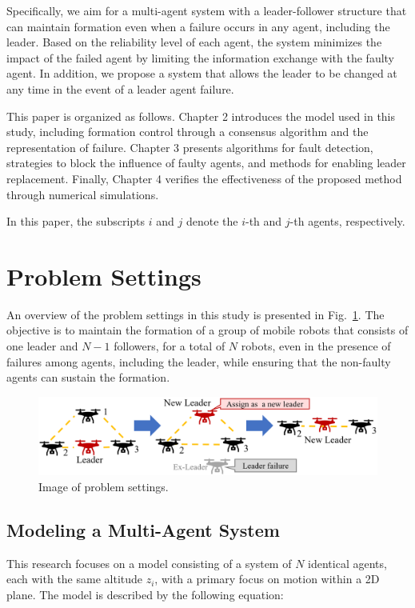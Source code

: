 \documentclass[a4paper,fleqn,10pt,twocolumn]{SICE_ISCS}
\newcommand{\Figref}[1]{{Fig.~\ref{#1}}}
\begin{document}
Specifically, we aim for a multi-agent system with a leader-follower structure that can maintain formation even when a failure occurs in any agent, including the leader. Based on the reliability level of each agent, the system minimizes the impact of the failed agent by limiting the information exchange with the faulty agent. In addition, we propose a system that allows the leader to be changed at any time in the event of a leader agent failure.

This paper is organized as follows. Chapter 2 introduces the model used in this study, including formation control through a consensus algorithm and the representation of failure. Chapter 3 presents algorithms for fault detection, strategies to block the influence of faulty agents, and methods for enabling leader replacement. Finally, Chapter 4 verifies the effectiveness of the proposed method through numerical simulations.

In this paper, the subscripts $i$ and $j$ denote the $i$-th and $j$-th agents, respectively.

\section{Problem Settings}
An overview of the problem settings in this study is presented in \Figref{Nice_image_fault}.
The objective is to maintain the formation of a group of mobile robots that consists of one leader and $N-1$ followers, for a total of $N$ robots, even in the presence of failures among agents, including the leader, while ensuring that the non-faulty agents can sustain the formation.
\begin{figure}[b]
	\begin{center}
		\includegraphics[width=\linewidth]{Fig/Nice_image_fault.eps}
		\caption{Image of problem settings.}
		\label{Nice_image_fault}
	\end{center}
	\vspace{-2mm}
\end{figure}

\subsection{Modeling a Multi-Agent System}
This research focuses on a model consisting of a system of $N$ identical agents, each with the same altitude $z_i$, with a primary focus on motion within a 2D plane. The model is described by the following equation:
\end{document}
